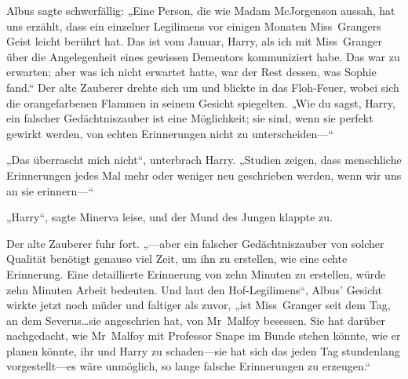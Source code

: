 Albus sagte schwerfällig:
„Eine Person, die wie Madam McJorgenson aussah, hat uns erzählt, dass ein einzelner Legilimens vor einigen Monaten Miss~Grangers Geist leicht berührt hat. Das ist vom Januar, Harry, als ich mit Miss~Granger über die Angelegenheit eines gewissen Dementors kommuniziert habe. Das war zu erwarten; aber was ich nicht erwartet hatte, war der Rest dessen, was Sophie fand.“ Der alte Zauberer drehte sich um und blickte in das Floh-Feuer, wobei sich die orangefarbenen Flammen in seinem Gesicht spiegelten.
„Wie du sagst, Harry, ein falscher Gedächtniszauber ist eine Möglichkeit; sie sind, wenn sie perfekt gewirkt werden, von echten Erinnerungen nicht zu unterscheiden—“

„Das überrascht mich nicht“, unterbrach Harry.
„Studien zeigen, dass menschliche Erinnerungen jedes Mal mehr oder weniger neu geschrieben werden, wenn wir uns an sie erinnern—“

„Harry“, sagte Minerva leise, und der Mund des Jungen klappte zu.

Der alte Zauberer fuhr fort. „—aber ein falscher Gedächtniszauber von solcher Qualität benötigt genauso viel Zeit, um ihn zu erstellen, wie eine echte Erinnerung. Eine detaillierte Erinnerung von zehn Minuten zu erstellen, würde zehn Minuten Arbeit bedeuten. Und laut den Hof-Legilimens“, Albus’ Gesicht wirkte jetzt noch müder und faltiger als zuvor, „ist Miss~Granger seit dem Tag, an dem Severus…sie angeschrien hat, von Mr~Malfoy besessen. Sie hat darüber nachgedacht, wie Mr~Malfoy mit Professor Snape im Bunde stehen könnte, wie er planen könnte, ihr und Harry zu schaden—sie hat sich das jeden Tag stundenlang vorgestellt—es wäre unmöglich, so lange falsche Erinnerungen zu erzeugen.“


